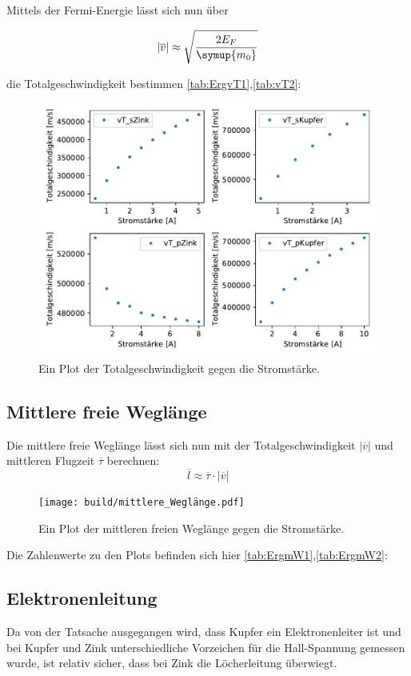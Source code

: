     Mittels der Fermi-Energie lässt sich nun über 

    \begin{equation}
        |\overline{v}| \approx \sqrt{\frac{2E_F}{\symup{m_0}}} \nonumber
    \end{equation}

    die Totalgeschwindigkeit bestimmen \ref{tab:ErgvT1},\ref{tab:vT2}: 

    \begin{figure}[H]
        \centering
        \includegraphics[width=1.1\textwidth]{build/Totalgeschwindigkeit.pdf}
        \caption{Ein Plot der Totalgeschwindigkeit gegen die Stromstärke.}
        \label{img:vT}
    \end{figure}


    \subsection{Mittlere freie Weglänge}


    Die mittlere freie Weglänge lässt sich nun mit der Totalgeschwindigkeit $|\overline{v}|$ und mittleren Flugzeit $\overline{\tau}$ berechnen:
    \begin{equation}
        \overline{l} \approx \overline{\tau} \cdot |\overline{v}| \nonumber
    \end{equation}

    
    \begin{figure}[H]
        \centering
        \texttt{[image: build/mittlere\_Weglänge.pdf]}
        \caption{Ein Plot der mittleren freien Weglänge gegen die Stromstärke.}
        \label{img:mfl}
    \end{figure}
    \noindent
    Die Zahlenwerte zu den Plots befinden sich hier \ref{tab:ErgmW1},\ref{tab:ErgmW2}:

    \subsection{Elektronenleitung}
    Da von der Tatsache ausgegangen wird, dass Kupfer ein Elektronenleiter ist und bei Kupfer und Zink unterschiedliche Vorzeichen für
    die Hall-Spannung gemessen wurde, ist relativ sicher, dass bei Zink die Löcherleitung überwiegt.